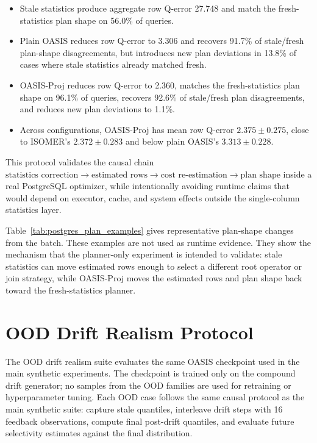 \documentclass[runningheads]{llncs}
\begin{document}
\begin{itemize}
  \item Stale statistics produce aggregate row Q-error 27.748 and match the
        fresh-statistics plan shape on 56.0\% of queries.
  \item Plain OASIS reduces row Q-error to 3.306 and recovers 91.7\% of
        stale/fresh plan-shape disagreements, but introduces new plan
        deviations in 13.8\% of cases where stale statistics already matched
        fresh.
  \item OASIS-Proj reduces row Q-error to 2.360, matches the fresh-statistics
        plan shape on 96.1\% of queries, recovers 92.6\% of stale/fresh plan
        disagreements, and reduces new plan deviations to 1.1\%.
  \item Across configurations, OASIS-Proj has mean row Q-error
        $2.375\pm0.275$, close to ISOMER's $2.372\pm0.283$ and below plain
        OASIS's $3.313\pm0.228$.
\end{itemize}

This protocol validates the causal chain
$\text{statistics correction} \rightarrow \text{estimated rows}
 \rightarrow \text{cost re-estimation} \rightarrow \text{plan shape}$
inside a real PostgreSQL optimizer, while intentionally avoiding runtime
claims that would depend on executor, cache, and system effects outside the
single-column statistics layer.



Table~\ref{tab:postgres_plan_examples} gives representative plan-shape changes
from the batch. These examples are not used as runtime evidence. They show the
mechanism that the planner-only experiment is intended to validate: stale
statistics can move estimated rows enough to select a different root operator
or join strategy, while OASIS-Proj moves the estimated rows and plan shape back
toward the fresh-statistics planner.

\section{OOD Drift Realism Protocol}
\label{sec:ood-drift-app}

The OOD drift realism suite evaluates the same OASIS checkpoint used in the
main synthetic experiments. The checkpoint is trained only on the compound drift
generator; no samples from the OOD families are used for retraining or
hyperparameter tuning. Each OOD case follows the same causal protocol as the
main synthetic suite: capture stale quantiles, interleave drift steps with 16
feedback observations, compute final post-drift quantiles, and evaluate future
selectivity estimates against the final distribution.
\end{document}
